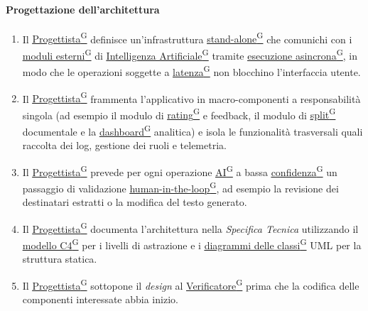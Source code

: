 \documentclass[a4paper,12pt]{article}
\providecommand{\glslink}[2]{\href{https://alittlebyte-19.github.io/Documentazione/glossario.html\#gls-#1}{\underline{#2}\textsuperscript{\scriptsize G}}}
\begin{document}
\paragraph{Progettazione dell'architettura}
\begin{enumerate}
    \item Il \glslink{progettista}{Progettista} definisce un'infrastruttura \glslink{standalone}{stand-alone} che comunichi con i \glslink{moduli-esterni}{moduli esterni} di \glslink{intelligenza-artificiale-ai}{Intelligenza Artificiale} tramite \glslink{esecuzione-asincrona}{esecuzione asincrona}, in modo che le operazioni soggette a \glslink{latenza}{latenza} non blocchino l'interfaccia utente.
    \item Il \glslink{progettista}{Progettista} frammenta l'applicativo in macro-componenti a responsabilità singola (ad esempio il modulo di \glslink{rating}{rating} e feedback, il modulo di \glslink{split-automatico}{split} documentale e la \glslink{dashboard}{dashboard} analitica) e isola le funzionalità trasversali quali raccolta dei log, gestione dei ruoli e telemetria.
    \item Il \glslink{progettista}{Progettista} prevede per ogni operazione \glslink{intelligenza-artificiale-ai}{AI} a bassa \glslink{confidenza-confidence-score}{confidenza} un passaggio di validazione \glslink{human-in-the-loop}{human-in-the-loop}, ad esempio la revisione dei destinatari estratti o la modifica del testo generato.
    \item Il \glslink{progettista}{Progettista} documenta l'architettura nella \textit{Specifica Tecnica} utilizzando il \glslink{modello-c4}{modello C4} per i livelli di astrazione e i \glslink{diagramma-delle-classi-uml}{diagrammi delle classi} UML per la struttura statica.
    \item Il \glslink{progettista}{Progettista} sottopone il \textit{design} al \glslink{verificatore}{Verificatore} prima che la codifica delle componenti interessate abbia inizio.
\end{enumerate}
\end{document}
